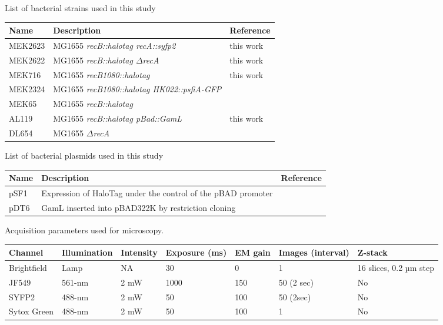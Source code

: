 
\begin{supptable}[htbp]
    \centering
    \caption{List of bacterial strains used in this study}
    \begin{tabular}{lll}
        \toprule
        Name & Description & Reference\\
        \midrule
        MEK2623 & MG1655 \textit{recB::halotag recA::syfp2} & this work\\
        MEK2622 & MG1655 \textit{recB::halotag $\Delta$recA} & this work \\ %
        MEK716 & MG1655 \textit{recB1080::halotag} & this work \\ %
        MEK2324 & MG1655 \textit{recB1080::halotag HK022::psfiA-GFP} & \cite{Lepore2023} \\
        MEK65 & MG1655 \textit{recB::halotag} & \cite{Lepore2019a} \\
        AL119 & MG1655 \textit{recB::halotag pBad::GamL} & this work \\ %
        DL654 & MG1655 \textit{$\Delta$recA} & \cite{Wertman1986} \\
        \bottomrule
    \end{tabular}
    \label{SItab:strains}
\end{supptable}

\begin{supptable}[htbp]
    \centering
    \caption{List of bacterial plasmids used in this study}
    \begin{tabular}{lll}
        \toprule
        Name & Description & Reference\\
        \midrule
        pSF1 & Expression of HaloTag under the control of the pBAD promoter & \cite{Lepore2019a} \\
        pDT6 & GamL inserted into pBAD322K by restriction cloning & \cite{Wilkinson2016} \\
        \bottomrule
    \end{tabular}
    \label{SItab:plasmids}
\end{supptable}

\begin{supptable}[htbp]
    \centering
    \caption{Acquisition parameters used for microscopy.}
    \begin{tabular}{lllllll}
        \toprule
        Channel & Illumination & Intensity & Exposure (ms) & EM gain & Images (interval) & Z-stack\\
        \midrule
        Brightfield & Lamp & NA & 30 & 0 & 1 & 16 slices, 0.2 µm step\\
        JF549 & 561-nm & 2 mW & 1000 & 150 & 50 (2 sec) & No\\
        SYFP2 & 488-nm & 2 mW & 50 & 100 & 50 (2sec) & No\\
        Sytox Green & 488-nm & 2 mW & 50 & 100 & 1 & No\\
        \bottomrule
    \end{tabular}
    \label{SItab:acquisition_channels}
\end{supptable}

